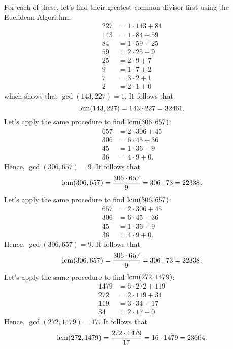 \begin{solution}
    For each of these, let's find their greatest common divisor first using the Euclidean Algorithm.
    \begin{align*}
        227 &= 1 \cdot 143 + 84 \\
        143 &= 1 \cdot 84 + 59 \\
        84 &= 1 \cdot 59 + 25 \\
        59 &= 2 \cdot 25 + 9 \\
        25 &= 2 \cdot 9 + 7 \\
        9 &= 1\cdot 7 + 2 \\
        7 &= 3 \cdot 2 + 1 \\
        2 &= 2 \cdot 1 + 0
    \end{align*}
    which shows that $\gcd(143, 227) = 1$. It follows that
    $$\operatorname{lcm}(143, 227) = 143 \cdot 227 = 32461.$$
    Let's apply the same procedure to find $\operatorname{lcm}(306, 657)$:
    \begin{align*}
        657 &= 2 \cdot 306 + 45 \\
        306 &= 6 \cdot 45 + 36 \\
        45 &= 1 \cdot 36 + 9 \\
        36 &= 4 \cdot 9 + 0.
    \end{align*}
    Hence, $\gcd(306, 657) = 9$. It follows that
    $$\operatorname{lcm}(306, 657) = \frac{306 \cdot 657}{9} = 306 \cdot 73 = 22338.$$
    Let's apply the same procedure to find $\operatorname{lcm}(306, 657)$:
    \begin{align*}
        657 &= 2 \cdot 306 + 45 \\
        306 &= 6 \cdot 45 + 36 \\
        45 &= 1 \cdot 36 + 9 \\
        36 &= 4 \cdot 9 + 0.
    \end{align*}
    Hence, $\gcd(306, 657) = 9$. It follows that
    $$\operatorname{lcm}(306, 657) = \frac{306 \cdot 657}{9} = 306 \cdot 73 = 22338.$$
    Let's apply the same procedure to find $\operatorname{lcm}(272, 1479)$:
    \begin{align*}
        1479 &= 5\cdot 272 + 119 \\
        272 &= 2\cdot 119 + 34 \\
        119 &= 3\cdot 34 + 17 \\
        34 &= 2 \cdot 17 + 0
    \end{align*}
    Hence, $\gcd(272, 1479) = 17$. It follows that
    $$\operatorname{lcm}(272, 1479) = \frac{272 \cdot 1479}{17} = 16 \cdot 1479 = 23664.$$
\end{solution}


